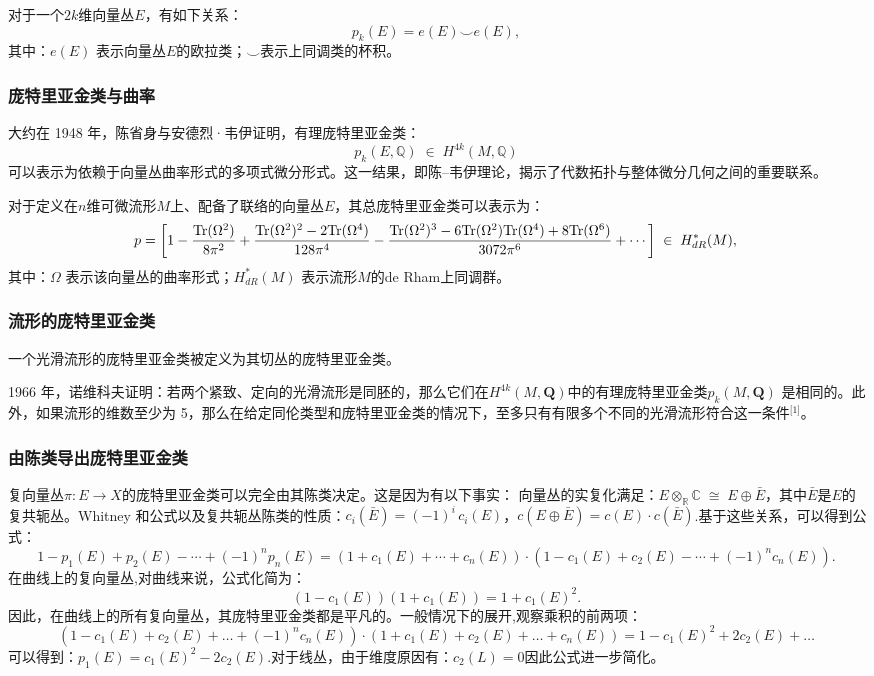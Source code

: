 对于一个$2k$维向量丛$E$，有如下关系：
$$
p_k(E) = e(E) \smile e(E),~
$$
其中：$e(E)$ 表示向量丛$E$的欧拉类；$\smile$表示上同调类的杯积。
\subsubsection{庞特里亚金类与曲率}
大约在 1948 年，陈省身与安德烈·韦伊证明，有理庞特里亚金类：
$$
p_k(E, \mathbb{Q}) \;\in\; H^{4k}(M, \mathbb{Q})~
$$
可以表示为依赖于向量丛曲率形式的多项式微分形式。这一结果，即陈–韦伊理论，揭示了代数拓扑与整体微分几何之间的重要联系。

对于定义在$n$维可微流形$M$上、配备了联络的向量丛$E$，其总庞特里亚金类可以表示为：
$$
p = \left[
1
-\frac{{\rm Tr}(\Omega^2)}{8\pi^2}
+\frac{{\rm Tr}(\Omega^2)^2 - 2{\rm Tr}(\Omega^4)}{128\pi^4}
-\frac{{\rm Tr}(\Omega^2)^3 - 6{\rm Tr}(\Omega^2){\rm Tr}(\Omega^4) + 8{\rm Tr}(\Omega^6)}{3072\pi^6}
+\cdots
\right]
\;\in\; H_{dR}^*(M),~
$$
其中：$\Omega$ 表示该向量丛的曲率形式；$H_{dR}^*(M)$ 表示流形$M$的de Rham上同调群。
\subsubsection{流形的庞特里亚金类}
一个光滑流形的庞特里亚金类被定义为其切丛的庞特里亚金类。

1966 年，诺维科夫证明：若两个紧致、定向的光滑流形是同胚的，那么它们在$H^{4k}(M, \mathbf{Q})$中的有理庞特里亚金类$p_k(M, \mathbf{Q})$ 是相同的。此外，如果流形的维数至少为 5，那么在给定同伦类型和庞特里亚金类的情况下，至多只有有限多个不同的光滑流形符合这一条件\(^\text{[1]}\)。
\subsubsection{由陈类导出庞特里亚金类}
复向量丛$\pi: E \to X$的庞特里亚金类可以完全由其陈类决定。这是因为有以下事实：
向量丛的实复化满足：$E \otimes_{\mathbb{R}} \mathbb{C} \;\cong\; E \oplus \bar{E}$，其中$\bar{E}$是$E$的复共轭丛。Whitney 和公式以及复共轭丛陈类的性质：$c_i(\bar{E}) = (-1)^i \, c_i(E)$，$c(E \oplus \bar{E}) = c(E) \cdot c(\bar{E})$.基于这些关系，可以得到公式：
$$
1 - p_1(E) + p_2(E) - \cdots + (-1)^n p_n(E)
= (1 + c_1(E) + \cdots + c_n(E)) \cdot (1 - c_1(E) + c_2(E) - \cdots + (-1)^n c_n(E)).~
$$
在曲线上的复向量丛,对曲线来说，公式化简为：
$$
(1 - c_1(E))(1 + c_1(E)) = 1 + c_1(E)^2.~
$$
因此，在曲线上的所有复向量丛，其庞特里亚金类都是平凡的。一般情况下的展开,观察乘积的前两项：
$$
(1 - c_1(E) + c_2(E) + \ldots + (-1)^n c_n(E))
\cdot
(1 + c_1(E) + c_2(E) + \ldots + c_n(E))
= 1 - c_1(E)^2 + 2c_2(E) + \ldots~
$$
可以得到：$p_1(E) = c_1(E)^2 - 2c_2(E)$.对于线丛，由于维度原因有：$c_2(L) = 0$因此公式进一步简化。
